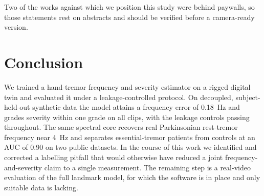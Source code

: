 \documentclass[conference]{IEEEtran}
\begin{document}
Two of the works against which we position this study were behind paywalls, so
those statements rest on abstracts and should be verified before a camera-ready
version.

\section{Conclusion}
We trained a hand-tremor frequency and severity estimator on a rigged digital twin
and evaluated it under a leakage-controlled protocol. On decoupled,
subject-held-out synthetic data the model attains a frequency error of 0.18~Hz and
grades severity within one grade on all clips, with the leakage controls passing
throughout. The same spectral core recovers real Parkinsonian rest-tremor frequency
near 4~Hz and separates essential-tremor patients from controls at an AUC of 0.90
on two public datasets. In the course of this work we identified and corrected a
labelling pitfall that would otherwise have reduced a joint frequency-and-severity
claim to a single measurement. The remaining step is a real-video evaluation of the
full landmark model, for which the software is in place and only suitable data is
lacking.
\end{document}
